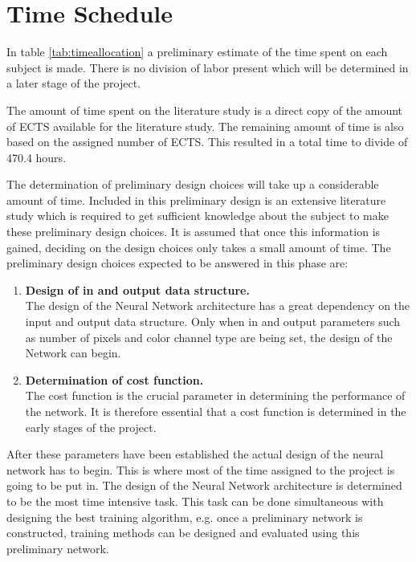 \section{Time Schedule}
\label{TimeTable}

In table \ref{tab:timeallocation} a preliminary estimate of the time spent on each subject is made. There is no division of labor present which will be determined in a later stage of the project.

The amount of time spent on the literature study is a direct copy of the amount of ECTS available for the literature study. The remaining amount of time is also based on the assigned number of ECTS. This resulted in a total time to divide of 470.4 hours.

The determination of preliminary design choices will take up a considerable amount of time. Included in this preliminary design is an extensive literature study which is required to get sufficient knowledge about the subject to make these preliminary design choices. It is assumed that once this information is gained, deciding on the design choices only takes a small amount of time. The preliminary design choices expected to be answered in this phase are: 

\begin{enumerate}
	\item \textbf{Design of in and output data structure.} \\ The design of the Neural Network architecture has a great dependency on the input and output data structure. Only when in and output parameters such as number of pixels and color channel type are being set, the design of the Network can begin.
	\item \textbf{Determination of cost function.} \\ The cost function is the crucial parameter in determining the performance of the network. It is therefore essential that a cost function is determined in the early stages of the project.	
\end{enumerate}

After these parameters have been established the actual design of the neural network has to begin. This is where most of the time assigned to the project is going to be put in. The design of the Neural Network architecture is determined to be the most time intensive task. This task can be done simultaneous with designing the best training algorithm, e.g. once a preliminary network is constructed, training methods can be designed and evaluated using this preliminary network.

